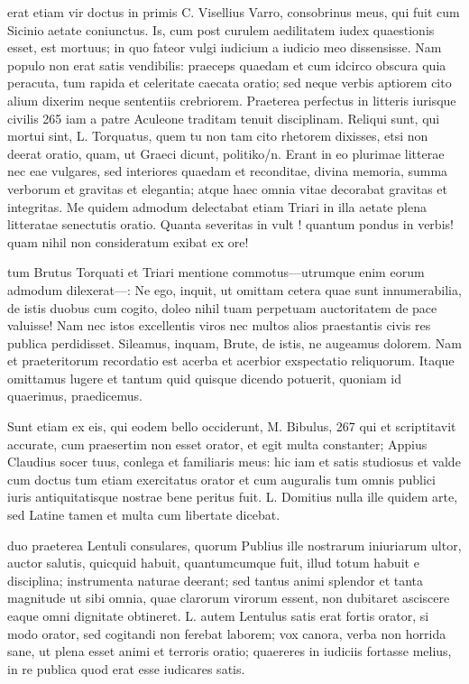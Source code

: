 erat etiam vir doctus in primis C. Visellius Varro, consobrinus meus, qui fuit cum Sicinio aetate coniunctus. Is, cum post curulem aedilitatem iudex quaestionis esset, est mortuus; in quo fateor vulgi iudicium a iudicio meo dissensisse. Nam populo non erat satis vendibilis: praeceps quaedam et cum idcirco obscura quia peracuta, tum rapida et celeritate caecata oratio; sed neque verbis aptiorem cito alium dixerim neque sententiis crebriorem. Praeterea perfectus in litteris iurisque civilis 265 iam a patre Aculeone traditam tenuit disciplinam. Reliqui sunt, qui mortui sint, L. Torquatus, quem tu non tam cito rhetorem dixisses, etsi non deerat oratio, quam, ut Graeci dicunt, politiko/n. Erant in eo plurimae litterae nec eae vulgares, sed interiores quaedam et reconditae, divina memoria, summa verborum et gravitas et elegantia; atque haec omnia vitae decorabat gravitas et integritas. Me quidem admodum delectabat etiam Triari in illa aetate plena litteratae senectutis oratio. Quanta severitas in vult ! quantum pondus in verbis! quam nihil non consideratum exibat ex ore!

 tum Brutus Torquati et Triari mentione commotus—utrumque enim eorum admodum dilexerat—: Ne ego, inquit, ut omittam cetera quae sunt innumerabilia, de istis duobus cum cogito, doleo nihil tuam perpetuam auctoritatem de pace valuisse! Nam nec istos excellentis viros nec multos alios praestantis civis res publica perdidisset. Sileamus, inquam, Brute, de istis, ne augeamus dolorem. Nam et praeteritorum recordatio est acerba et acerbior exspectatio reliquorum. Itaque omittamus lugere et tantum quid quisque dicendo potuerit, quoniam id quaerimus, praedicemus.

 Sunt etiam ex eis, qui eodem bello occiderunt, M. Bibulus, 267 qui et scriptitavit accurate, cum praesertim non esset orator, et egit multa constanter; Appius Claudius socer tuus, conlega et familiaris meus: hic iam et satis studiosus et valde cum doctus tum etiam exercitatus orator et cum auguralis tum omnis publici iuris antiquitatisque nostrae bene peritus fuit. L. Domitius nulla ille quidem arte, sed Latine tamen et multa cum libertate dicebat.

 duo praeterea Lentuli consulares, quorum Publius ille nostrarum iniuriarum ultor, auctor salutis, quicquid habuit, quantumcumque fuit, illud totum habuit e disciplina; instrumenta naturae deerant; sed tantus animi splendor et tanta magnitude ut sibi omnia, quae clarorum virorum essent, non dubitaret asciscere eaque omni dignitate obtineret. L. autem Lentulus satis erat fortis orator, si modo orator, sed cogitandi non ferebat laborem; vox canora, verba non horrida sane, ut plena esset animi et terroris oratio; quaereres in iudiciis fortasse melius, in re publica quod erat esse iudicares satis.

